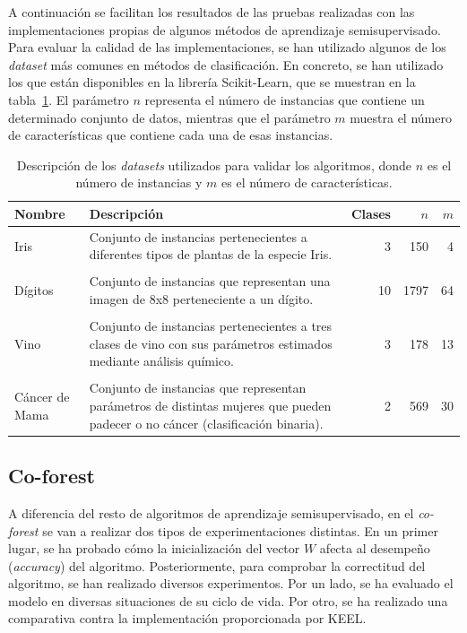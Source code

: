 A continuación se facilitan los resultados de las pruebas realizadas con las implementaciones propias de algunos métodos de aprendizaje semisupervisado. Para evaluar la calidad de las implementaciones, se han utilizado algunos de los \textit{dataset} más comunes en métodos de clasificación. En concreto, se han utilizado los que están disponibles en la librería Scikit-Learn, que se muestran en la tabla~\ref{tabla_datasets_sklearn}. El parámetro $n$ representa el número de instancias que contiene un determinado conjunto de datos, mientras que el parámetro $m$ muestra el número de características que contiene cada una de esas instancias.

\begin{table}
	\small
	\begin{centering}
		\begin{tabular}{@{}p{4em} p{20em} r r r @{}}
			\toprule
			\textbf{Nombre} & \textbf{Descripción} & \textbf{Clases} & $n$ & $m$\\ 
			\midrule
			
			Iris & Conjunto de instancias pertenecientes a diferentes tipos de plantas de la especie Iris. & 3 & 150 & 4 \\\\
			Dígitos & Conjunto de instancias que representan una imagen de 8x8 perteneciente a un dígito. & 10 & 1797 & 64 \\\\
			Vino & Conjunto de instancias pertenecientes a tres clases de vino con sus parámetros estimados mediante análisis químico. & 3 & 178 & 13 \\\\
			Cáncer de Mama & Conjunto de instancias que representan parámetros de distintas mujeres que pueden padecer o no cáncer (clasificación binaria). & 2 & 569 & 30 \\
			\bottomrule
		\end{tabular}
	\end{centering}
	\caption[Experimentación: \textit{datasets} estándar]{Descripción de los \textit{datasets} utilizados para validar los algoritmos, donde $n$ es el número de instancias y $m$ es el número de características.}
	\label{tabla_datasets_sklearn}	
\end{table}



\subsection{Co-forest}
\label{coforest-exp}
A diferencia del resto de algoritmos de aprendizaje semisupervisado, en el \textit{co-forest} se van a realizar dos tipos de experimentaciones distintas. En un primer lugar, se ha probado cómo la inicialización del vector $W$ afecta al desempeño (\textit{accuracy}) del algoritmo. Posteriormente, para comprobar la correctitud del algoritmo, se han realizado diversos experimentos. Por un lado, se ha evaluado el modelo en diversas situaciones de su ciclo de vida. Por otro, se ha realizado una comparativa contra la implementación proporcionada por KEEL.


